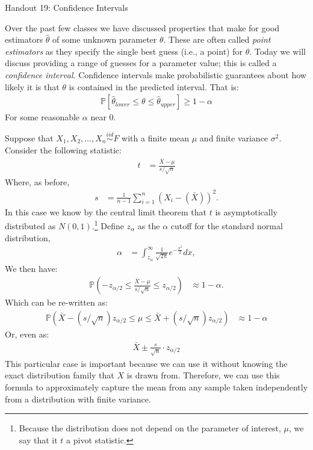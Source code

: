 \documentclass{tufte-handout}
\newcommand{\iid}{\stackrel{iid}{\sim}}
\begin{document}
\justify

{\LARGE Handout 19: Confidence Intervals}

\vspace*{18pt}

\noindent

Over the past few classes we have discussed properties that make
for good estimators $\widehat{\theta}$ of some unknown parameter
$\theta$. These are often called \textit{point estimators} as they
specify the single best guess (i.e., a point) for $\theta$. Today
we will discuss providing a range of guesses for a parameter value;
this is called a \textit{confidence interval}. Confidence intervals
make probabilistic guarantees about how likely it is that $\theta$
is contained in the predicted interval. That is:
\begin{align*}
\mathbb{P} \left[ \widehat{\theta}_{lower} \leq \theta \leq \widehat{\theta}_{upper} \right] \geq 1 - \alpha
\end{align*}
For some reasonable $\alpha$ near $0$.

Suppose that $X_1, X_2, \ldots, X_n \iid F$ with a finite
mean $\mu$ and finite variance $\sigma^2$. Consider
the following statistic:
\begin{align*}
t &= \frac{\bar{X} - \mu}{s / \sqrt{n}}
\end{align*}
Where, as before,
\begin{align*}
s &= \frac{1}{n-1} \sum_{i=1}^n (X_i - (\bar{X}))^2.
\end{align*}
In this case we know by the central limit theorem that $t$
is asymptotically distributed as $N(0,1)$.\footnote{Because the
distribution does not depend on the parameter of interest, $\mu$,
we say that it $t$ a pivot statistic.}
Define $z_{\alpha}$ as the $\alpha$ cutoff for the
standard normal distribution,
\begin{align*}
\alpha &= \int_{z_\alpha}^\infty \frac{1}{\sqrt{2\pi}} e^{-\frac{x^2}{2}} dx,
\end{align*}
We then have:
\begin{align*}
\mathbb{P} \left( -z_{\alpha/2} \leq \frac{\bar{X} - \mu}{s / \sqrt{n}} \leq z_{\alpha/2} \right) &\approx 1 - \alpha.
\end{align*}
Which can be re-written as:
\begin{align*}
\mathbb{P} \left( \bar{X} - (s / \sqrt{n}) z_{\alpha/2} \leq \mu \leq \bar{X} +(s / \sqrt{n}) z_{\alpha/2} \right) &\approx 1 - \alpha
\end{align*}
Or, even as:
\begin{align*}
\bar{X} \pm \frac{s}{\sqrt{n}} \cdot z_{\alpha/2}
\end{align*}
This particular case is important because we can use it without knowing
the exact distribution family that $X$ is drawn from. Therefore, we can
use this formula to approximately capture the mean from any sample taken
independently from a distribution with finite variance.
\end{document}
